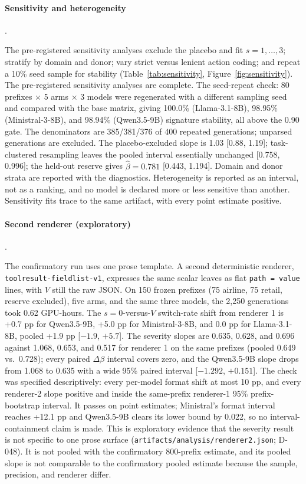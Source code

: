 \documentclass[a4paper,fleqn]{cas-sc}
\begin{document}
\paragraph{Sensitivity and heterogeneity}.\

The pre-registered sensitivity analyses exclude the placebo and fit $s=1,\dots,3$; stratify by
domain and donor; vary strict versus lenient action coding; and repeat a 10\% seed sample for
stability (Table~\ref{tab:sensitivity}, Figure~\ref{fig:sensitivity}). The pre-registered sensitivity analyses are complete. The seed-repeat check: 80
prefixes $\times$ 5 arms $\times$ 3 models were regenerated with a different sampling seed and
compared with the base matrix, giving 100.0\% (Llama-3.1-8B), 98.95\% (Ministral-3-8B), and 98.94\%
(Qwen3.5-9B) signature stability, all above the 0.90 gate. The denominators are 385/381/376 of 400
repeated generations; unparsed generations are excluded. The placebo-excluded slope is 1.03
[0.88, 1.19]; task-clustered resampling leaves the pooled interval essentially unchanged
[0.758, 0.996]; the held-out reserve gives $\hat\beta = 0.781$ [0.443, 1.194]. Domain and donor
strata are reported with the diagnostics. Heterogeneity is reported as an interval, not as a
ranking, and no model is declared more or less sensitive than another. Sensitivity fits trace
to the same artifact, with every point estimate positive.


\paragraph{Second renderer (exploratory)}.\

The confirmatory run uses one prose template. A second deterministic renderer,
\texttt{toolresult-fieldlist-v1}, expresses the same scalar leaves as flat
\texttt{path = value} lines, with $V$ still the raw JSON. On 150 frozen prefixes (75 airline, 75
retail, reserve excluded), five arms, and the same three models, the 2{,}250 generations took
0.62 GPU-hours. The $s=0$-versus-$V$ switch-rate shift from renderer 1 is +0.7 pp for
Qwen3.5-9B, +5.0 pp for Ministral-3-8B, and 0.0 pp for Llama-3.1-8B, pooled +1.9 pp
[$-1.9$, $+5.7$]. The severity slopes are 0.635, 0.628, and 0.696 against 1.068, 0.653, and
0.517 for renderer 1 on the same prefixes (pooled 0.649 vs.\ 0.728); every paired
$\Delta\beta$ interval covers zero, and the Qwen3.5-9B slope drops from 1.068 to 0.635 with a
wide 95\% paired interval [$-1.292$, $+0.151$]. The check was specified descriptively: every
per-model format shift at most 10 pp, and every renderer-2 slope positive and inside the
same-prefix renderer-1 95\% prefix-bootstrap interval. It passes on point estimates;
Ministral's format interval reaches +12.1 pp and Qwen3.5-9B clears its lower bound by 0.022, so
no interval-containment claim is made. This is exploratory evidence that the severity result is
not specific to one prose surface
(\texttt{artifacts/\allowbreak analysis/\allowbreak renderer2.json}; D-048). It is not pooled
with the confirmatory 800-prefix estimate, and its pooled slope is not comparable to the
confirmatory pooled estimate because the sample, precision, and renderer differ.
\end{document}
